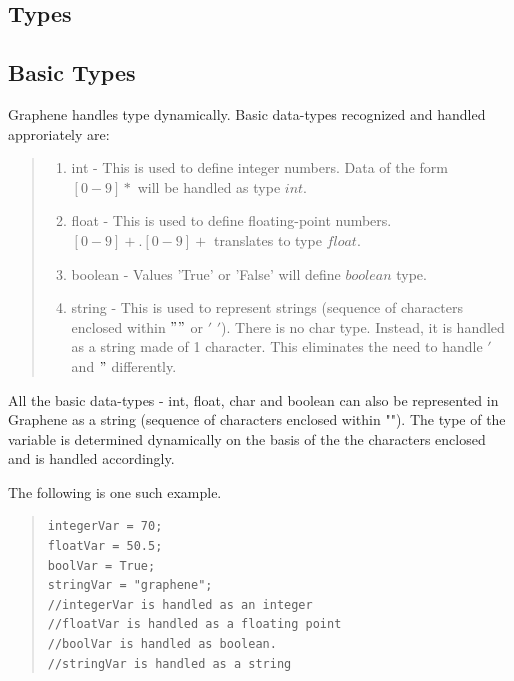 \documentclass[a4paper]{article}
\begin{document}
\begin{large}
\section{Types}

\subsection{Basic Types}
Graphene handles type dynamically. 
Basic data-types recognized and handled approriately are:

\begin{quote}
\begin{enumerate}
\item int - This is used to define integer numbers. Data of the form $[0-9]*$ will be handled as type $int$.
\item float - This is used to define floating-point numbers. $[0-9]+.[0-9]+$ translates to type $float$.
\item boolean - Values 'True' or 'False' will define $boolean$ type.
\item string - This is used to represent strings (sequence of characters enclosed within $""$ or $'$ $'$).
There is no char type. Instead, it is handled as a string made of 1 character. This eliminates the need to handle $'$ and $"$ differently.
\end{enumerate}
\end{quote}
All the basic data-types - int, float, char and boolean can also be represented in Graphene as a string (sequence of characters enclosed within ""). 
\newline
\newline
The type of the variable is determined dynamically on the basis of the the characters enclosed and is handled accordingly. 

The following is one such example.

\begin{multicols}{2}
\begin{quote}
\begin{verbatim}
integerVar = 70;		
floatVar = 50.5;		
boolVar = True;		
stringVar = "graphene";
//integerVar is handled as an integer
//floatVar is handled as a floating point
//boolVar is handled as boolean.
//stringVar is handled as a string
\end{verbatim}
\end{quote}
\end{multicols}


\end{large}
\end{document}
